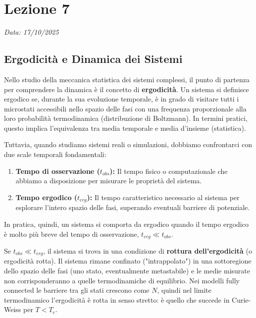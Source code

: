 \chapter{Lezione 7}
\label{chap:lezione_07}

\begin{flushright}
\textit{Data: 17/10/2025}
\end{flushright}

\section{Ergodicità e Dinamica dei Sistemi}

Nello studio della meccanica statistica dei sistemi complessi, il punto di partenza per comprendere la dinamica è il concetto di \textbf{ergodicità}.
Un sistema si definisce ergodico se, durante la sua evoluzione temporale, è in grado di visitare tutti i microstati accessibili nello spazio delle fasi con una frequenza proporzionale alla loro probabilità termodinamica (distribuzione di Boltzmann). In termini pratici, questo implica l'equivalenza tra media temporale e media d'insieme (statistica).

Tuttavia, quando studiamo sistemi reali o simulazioni, dobbiamo confrontarci con due scale temporali fondamentali:
\begin{enumerate}
    \item \textbf{Tempo di osservazione ($t_{obs}$):} Il tempo fisico o computazionale che abbiamo a disposizione per misurare le proprietà del sistema.
    \item \textbf{Tempo ergodico ($t_{erg}$):} Il tempo caratteristico necessario al sistema per esplorare l'intero spazio delle fasi, superando eventuali barriere di potenziale.
\end{enumerate}

\noindent In pratica, quindi, un sistema si comporta da ergodico quando il tempo ergodico è molto più breve del tempo di osservazione, $t_{erg} \ll t_{obs}$.

\noindent Se $t_{obs} \ll t_{erg}$, il sistema si trova in una condizione di \textbf{rottura dell'ergodicità} (o ergodicità rotta). Il sistema rimane confinato ("intrappolato") in una sottoregione dello spazio delle fasi (uno stato, eventualmente metastabile) e le medie misurate non corrisponderanno a quelle termodinamiche di equilibrio. Nei modelli fully connected le barriere tra gli stati crescono come $N$, quindi nel limite termodinamico l'ergodicità è rotta in senso stretto: è quello che succede in Curie-Weiss per $T<T_c$.

